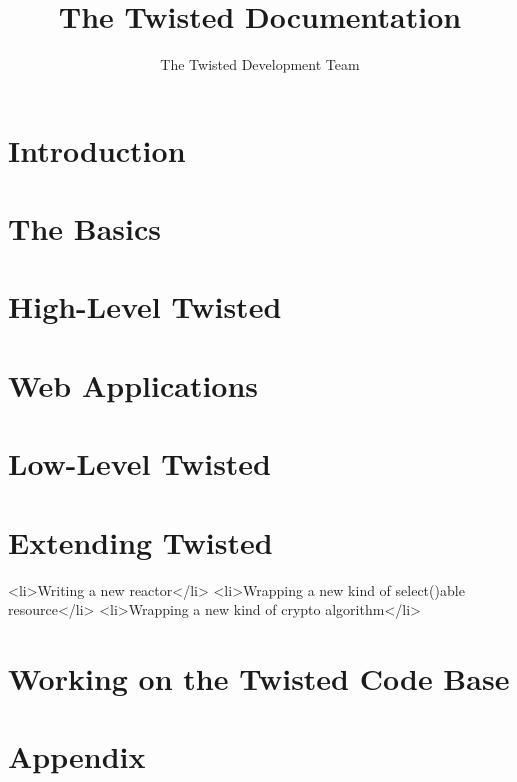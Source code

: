 \documentclass[oneside]{book}
\title{The Twisted Documentation}
\author{The Twisted Development Team}
\begin{document}
\maketitle

\chapter{Introduction}











\chapter{The Basics}









\chapter{High-Level Twisted}












\chapter{Web Applications }








\chapter{Low-Level Twisted }












\chapter{Extending Twisted}

    <li>Writing a new reactor</li>
    <li>Wrapping a new kind of select()able resource</li>
    <li>Wrapping a new kind of crypto algorithm</li>



\chapter{Working on the Twisted Code Base}






\chapter{Appendix}



\end{document}
